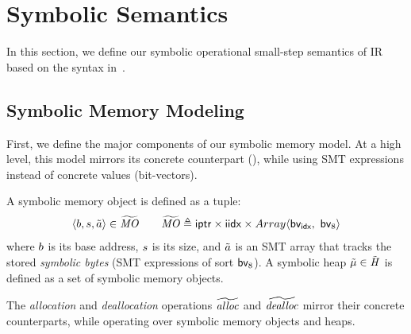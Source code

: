 \section{Symbolic Semantics}
\label{sec:symbolic-semantics}

In this section,
we define our symbolic operational small-step semantics of \llvm IR based on the syntax in~.

\subsection{Symbolic Memory Modeling}
\label{sec:symbolic-memory-modeling}

First, we define the major components of our symbolic memory model.
At a high level, this model mirrors its concrete counterpart (), while using SMT expressions instead of concrete values (\ie bit-vectors).

\begin{definition}
A symbolic memory object is defined as a tuple:
\[ \langle{b},{s},{\tilde{a}}\rangle \in \widetilde{\mathit{MO}} \quad \quad \widetilde{\mathit{MO}} \triangleq \textsf{i\textsf{ptr}} \times \textsf{i\textsf{idx}} \times Array\langle\textsf{bv}_{\textsf{idx}},~\textsf{bv}_{8}\rangle \]
where $b$ is its base address, $s$ is its size,
and $\tilde{a}$ is an SMT array that tracks the stored \emph{symbolic bytes} (\ie SMT expressions of sort $\textsf{bv}_{8}$).
A symbolic heap $\tilde{\mu} \in \tilde{\mathit{H}}$ is defined as a set of symbolic memory objects.
\end{definition}


The \emph{allocation} and \emph{deallocation} operations $\widetilde{\mathit{alloc}}$ and $\widetilde{\mathit{dealloc}}$ mirror their concrete counterparts,
while operating over symbolic memory objects and heaps.

